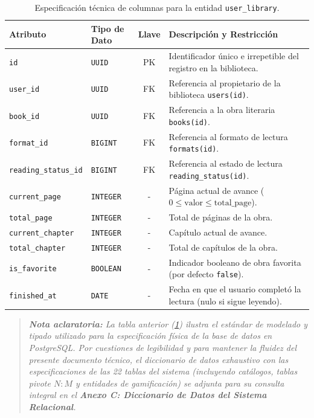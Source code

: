 \documentclass[12pt, atypical, journal]{article}
\begin{document}
\begin{table}[H]
    \centering
    \footnotesize
    \begin{tabular}{|l|l|c|p{6.5cm}|}
        \hline
        \textbf{Atributo} & \textbf{Tipo de Dato} & \textbf{Llave} & \textbf{Descripción y Restricción} \\ \hline
        \texttt{id} & \texttt{UUID} & PK & Identificador único e irrepetible del registro en la biblioteca. \\ \hline
        \texttt{user\_id} & \texttt{UUID} & FK & Referencia al propietario de la biblioteca \texttt{users(id)}. \\ \hline
        \texttt{book\_id} & \texttt{UUID} & FK & Referencia a la obra literaria \texttt{books(id)}. \\ \hline
        \texttt{format\_id} & \texttt{BIGINT} & FK & Referencia al formato de lectura \texttt{formats(id)}. \\ \hline
        \texttt{reading\_status\_id} & \texttt{BIGINT} & FK & Referencia al estado de lectura \texttt{reading\_status(id)}. \\ \hline
        \texttt{current\_page} & \texttt{INTEGER} & - & Página actual de avance ($0 \le \mathrm{valor} \le \mathrm{total\_page}$). \\ \hline
        \texttt{total\_page} & \texttt{INTEGER} & - & Total de páginas de la obra. \\ \hline
        \texttt{current\_chapter} & \texttt{INTEGER} & - & Capítulo actual de avance. \\ \hline
        \texttt{total\_chapter} & \texttt{INTEGER} & - & Total de capítulos de la obra. \\ \hline
        \texttt{is\_favorite} & \texttt{BOOLEAN} & - & Indicador booleano de obra favorita (por defecto \texttt{false}). \\ \hline
        \texttt{finished\_at} & \texttt{DATE} & - & Fecha en que el usuario completó la lectura (nulo si sigue leyendo). \\ \hline
    \end{tabular}
    \caption{Especificación técnica de columnas para la entidad \texttt{user\_library}.}
    \label{tab:sample_data_dictionary}
\end{table}

\vspace{0.2cm}

\begin{quote}
\textit{\textbf{Nota aclaratoria:} La tabla anterior (\ref{tab:sample_data_dictionary}) ilustra el estándar de modelado y tipado utilizado para la especificación física de la base de datos en PostgreSQL. Por cuestiones de legibilidad y para mantener la fluidez del presente documento técnico, el diccionario de datos exhaustivo con las especificaciones de las 22 tablas del sistema (incluyendo catálogos, tablas pivote $N:M$ y entidades de gamificación) se adjunta para su consulta integral en el \textbf{Anexo C: Diccionario de Datos del Sistema Relacional}.}
\end{quote}
\end{document}
